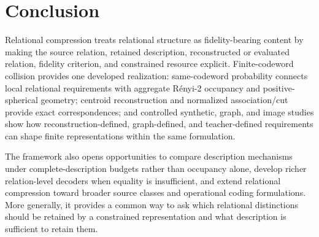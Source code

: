 \section{Conclusion}
\label{sec:conclusion}

Relational compression treats relational structure as fidelity-bearing content by making the source relation, retained description, reconstructed or evaluated relation, fidelity criterion, and constrained resource explicit.
Finite-codeword collision provides one developed realization: same-codeword probability connects local relational requirements with aggregate R\'enyi-2 occupancy and positive-spherical geometry; centroid reconstruction and normalized association/cut provide exact correspondences; and controlled synthetic, graph, and image studies show how reconstruction-defined, graph-defined, and teacher-defined requirements can shape finite representations within the same formulation.

The framework also opens opportunities to compare description mechanisms under complete-description budgets rather than occupancy alone, develop richer relation-level decoders when equality is insufficient, and extend relational compression toward broader source classes and operational coding formulations.
More generally, it provides a common way to ask which relational distinctions should be retained by a constrained representation and what description is sufficient to retain them.
